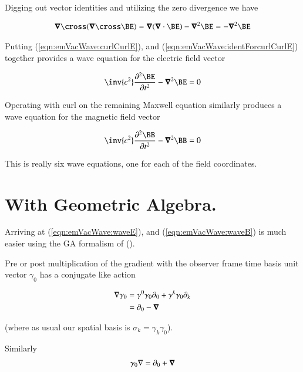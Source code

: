 Digging out vector identities and utilizing the zero divergence we have

\begin{align}\label{eqn:emVacWave:identForcurlCurlE}
\spacegrad \cross (\spacegrad \cross \BE) = \spacegrad (\spacegrad \cdot \BE) - \spacegrad^2 \BE = -\spacegrad^2 \BE
\end{align}

Putting (\ref{eqn:emVacWave:curlCurlE}), and (\ref{eqn:emVacWave:identForcurlCurlE}) together provides a wave equation for the electric field vector

\begin{align}\label{eqn:emVacWave:waveE}
\inv{c^2} \frac{\partial^2 \BE}{\partial t^2} - \spacegrad^2 \BE = 0
\end{align}

Operating with curl on the remaining Maxwell equation similarly produces a wave equation for the magnetic field vector

\begin{align}\label{eqn:emVacWave:waveB}
\inv{c^2} \frac{\partial^2 \BB}{\partial t^2} - \spacegrad^2 \BB = 0
\end{align}

This is really six wave equations, one for each of the field coordinates.

\section{With Geometric Algebra.}

Arriving at (\ref{eqn:emVacWave:waveE}), and (\ref{eqn:emVacWave:waveB}) is much easier using the GA formalism of (\cite{doran2003gap}).

Pre or post multiplication of the gradient with the observer frame time basis unit vector $\gamma_0$ has a conjugate like
action

\begin{align*}
\nabla \gamma_0
&=
\gamma^0 \gamma_0 \partial_0 + \gamma^k \gamma_0 \partial_k \\
&=
\partial_0 - \boldsymbol{\nabla} \\
\end{align*}

(where as usual our spatial basis is $\sigma_k = \gamma_k \gamma_0$).

Similarly
\begin{align*}
\gamma_0 \nabla 
&=
\partial_0 + \boldsymbol{\nabla} \\
\end{align*}

